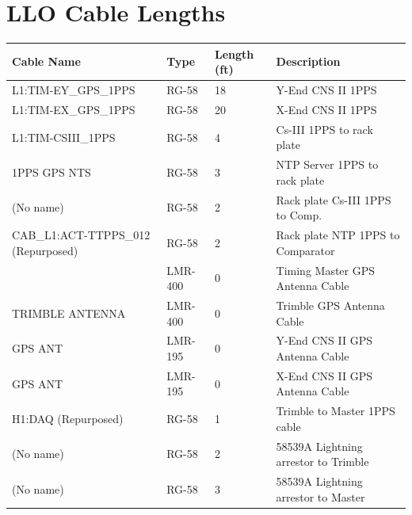 \documentclass{article}
\begin{document}
\section{LLO Cable Lengths}
\label{sec:llocables}
\begin{center}
  \begin{tabular}{ | l | l | l | l | }
    \hline
    \textbf{Cable Name}                 & \textbf{Type} & \textbf{Length (ft)}  & \textbf{Description} \\ \hline
    L1:TIM-EY\_GPS\_1PPS                & RG-58         & 18                    & Y-End CNS II 1PPS \\ \hline
    L1:TIM-EX\_GPS\_1PPS                & RG-58         & 20                    & X-End CNS II 1PPS \\ \hline
    L1:TIM-CSIII\_1PPS                  & RG-58         & 4                     & Cs-III 1PPS to rack plate \\ \hline
    1PPS GPS NTS                        & RG-58         & 3                     & NTP Server 1PPS to rack plate \\ \hline
    (No name)                           & RG-58         & 2                     & Rack plate Cs-III 1PPS to Comp. \\ \hline
    CAB\_L1:ACT-TTPPS\_012 (Repurposed) & RG-58         & 2                     & Rack plate NTP 1PPS to Comparator \\ \hline
                                        & LMR-400       & 0                     & Timing Master GPS Antenna Cable \\ \hline
    TRIMBLE ANTENNA                     & LMR-400       & 0                     & Trimble GPS Antenna Cable \\ \hline
    GPS ANT                             & LMR-195       & 0                     & Y-End CNS II GPS Antenna Cable \\ \hline
    GPS ANT                             & LMR-195       & 0                     & X-End CNS II GPS Antenna Cable \\ \hline
    H1:DAQ (Repurposed)                 & RG-58         & 1                     & Trimble to Master 1PPS cable \\ \hline
    (No name)                           & RG-58         & 2                     & 58539A Lightning arrestor to Trimble \\ \hline
    (No name)                           & RG-58         & 3                     & 58539A Lightning arrestor to Master \\ \hline
  \end{tabular}
\end{center}
\clearpage
\end{document}
